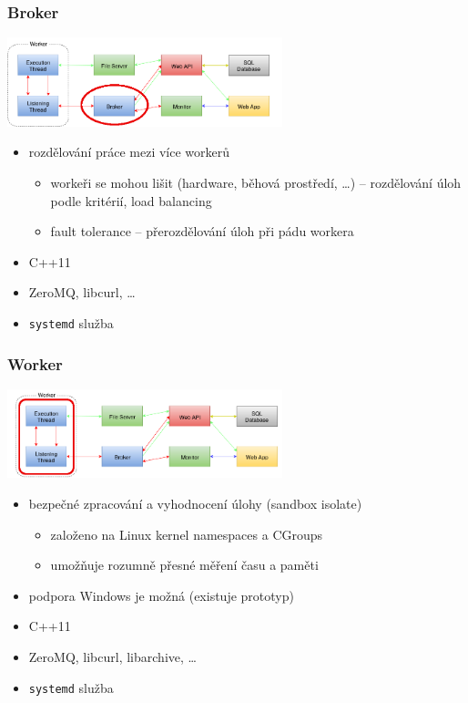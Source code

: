 \documentclass{beamer}
\begin{document}
\begin{frame}
	\frametitle{Broker}
	\begin{center}
		\includegraphics[width=0.6\textwidth]{images/communication-broker.png}
	\end{center}
	\begin{itemize}
		\item rozdělování práce mezi více workerů
			\begin{itemize}
				\item workeři se mohou lišit (hardware, běhová prostředí, \dots) 
					-- rozdělování úloh podle kritérií, load balancing
				\item fault tolerance -- přerozdělování úloh při pádu workera
			\end{itemize}
		\item C++11
		\item ZeroMQ, libcurl, \dots
		\item \texttt{systemd} služba
	\end{itemize}
\end{frame}

\begin{frame}
	\frametitle{Worker}
	\begin{center}
		\includegraphics[width=0.6\textwidth]{images/communication-worker.png}
	\end{center}
	\begin{itemize}
		\item bezpečné zpracování a vyhodnocení úlohy (sandbox isolate)
			\begin{itemize}
				\item založeno na Linux kernel namespaces a CGroups
				\item umožňuje rozumně přesné měření času a paměti
			\end{itemize}
		\item podpora Windows je možná (existuje prototyp)
		\item C++11
		\item ZeroMQ, libcurl, libarchive, \dots
		\item \texttt{systemd} služba
	\end{itemize}
\end{frame}
\end{document}

